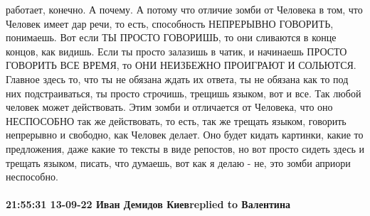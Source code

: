 







работает, конечно. А почему. А потому что отличие зомби от Человека в том, что
Человек имеет дар речи, то есть, способность НЕПРЕРЫВНО ГОВОРИТЬ, понимаешь.
Вот если ТЫ ПРОСТО ГОВОРИШЬ, то они сливаются в конце концов, как видишь. Если
ты просто залазишь в чатик, и начинаешь ПРОСТО ГОВОРИТЬ ВСЕ ВРЕМЯ, то ОНИ
НЕИЗБЕЖНО ПРОИГРАЮТ И СОЛЬЮТСЯ. Главное здесь то, что ты не обязана ждать их
ответа, ты не обязана как то под них подстраиваться, ты просто строчишь,
трещишь языком, вот и все. Так любой человек может действовать. Этим зомби и
отличается от Человека, что оно НЕСПОСОБНО так же действовать, то есть, так же
трещать языком, говорить непрерывно и свободно, как Человек делает. Оно будет
кидать картинки, какие то предложения, даже какие то тексты в виде репостов, но
вот просто сидеть здесь и трещать языком, писать, что думаешь, вот как я делаю
- не, это зомби априори неспособно.


\paragraph{21:55:31 13-09-22 Иван Демидов Киевreplied to Валентина}

